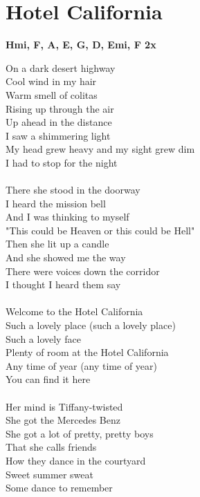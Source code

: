 \section{Hotel California}
\footnotesize\textbf{Hmi, F\kr \7, A, E, G, D, Emi, F\kr \7 2x}
\normalsize
\begin{multicols}{2}
On a dark desert highway\\
Cool wind in my hair\\
Warm smell of colitas\\
Rising up through the air\\
Up ahead in the distance\\
I saw a shimmering light\\
My head grew heavy and my sight grew dim\\
I had to stop for the night\\
\\
There she stood in the doorway\\
I heard the mission bell\\
And I was thinking to myself\\
"This could be Heaven or this could be Hell"\\
Then she lit up a candle\\
And she showed me the way\\
There were voices down the corridor\\
I thought I heard them say\\
\\
Welcome to the Hotel California\\
Such a lovely place (such a lovely place)\\
Such a lovely face\\
Plenty of room at the Hotel California\\
Any time of year (any time of year)\\
You can find it here\\
\columnbreak
\\
Her mind is Tiffany-twisted\\
She got the Mercedes Benz\\
She got a lot of pretty, pretty boys\\
That she calls friends\\
How they dance in the courtyard\\
Sweet summer sweat\\
Some dance to remember\\

\end{multicols}
